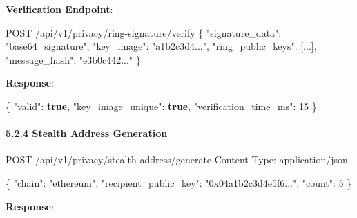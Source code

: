\documentclass[
  11pt,
]{article}
\newenvironment{Shaded}{\begin{snugshade}}{\end{snugshade}}
\newcommand{\DataTypeTok}[1]{\textcolor[rgb]{0.13,0.29,0.53}{#1}}
\newcommand{\DecValTok}[1]{\textcolor[rgb]{0.00,0.00,0.81}{#1}}
\newcommand{\FunctionTok}[1]{\textcolor[rgb]{0.00,0.00,0.00}{#1}}
\newcommand{\KeywordTok}[1]{\textcolor[rgb]{0.13,0.29,0.53}{\textbf{#1}}}
\newcommand{\NormalTok}[1]{#1}
\begin{document}
\textbf{Verification Endpoint}:

\begin{Shaded}
\begin{Highlighting}[]
\NormalTok{POST /api/v1/privacy/ring{-}signature/verify}
\NormalTok{\{}
\NormalTok{  "signature\_data": "base64\_signature",}
\NormalTok{  "key\_image": "a1b2c3d4...",}
\NormalTok{  "ring\_public\_keys": [...],}
\NormalTok{  "message\_hash": "e3b0c442..."}
\NormalTok{\}}
\end{Highlighting}
\end{Shaded}

\textbf{Response}:

\begin{Shaded}
\begin{Highlighting}[]
\FunctionTok{\{}
  \DataTypeTok{"valid"}\FunctionTok{:} \KeywordTok{true}\FunctionTok{,}
  \DataTypeTok{"key\_image\_unique"}\FunctionTok{:} \KeywordTok{true}\FunctionTok{,}
  \DataTypeTok{"verification\_time\_ms"}\FunctionTok{:} \DecValTok{15}
\FunctionTok{\}}
\end{Highlighting}
\end{Shaded}

\hypertarget{stealth-address-generation}{%
\paragraph{5.2.4 Stealth Address
Generation}\label{stealth-address-generation}}

\begin{Shaded}
\begin{Highlighting}[]
\NormalTok{POST /api/v1/privacy/stealth{-}address/generate}
\NormalTok{Content{-}Type: application/json}

\NormalTok{\{}
\NormalTok{  "chain": "ethereum",}
\NormalTok{  "recipient\_public\_key": "0x04a1b2c3d4e5f6...",}
\NormalTok{  "count": 5}
\NormalTok{\}}
\end{Highlighting}
\end{Shaded}

\textbf{Response}:
\end{document}

